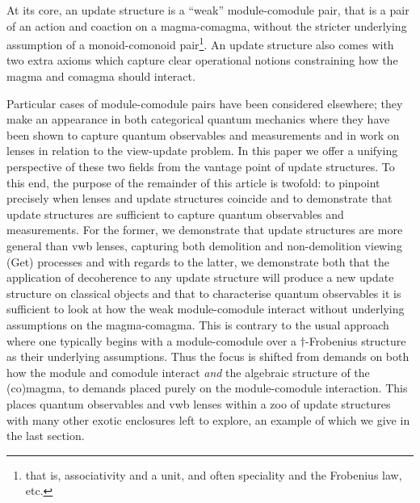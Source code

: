 \documentclass[submission,copyright,creativecommons,sharealike,noncommercial]{eptcs}
\theoremstyle{definition}
\theoremstyle{plain}
\theoremstyle{plain}
\begin{document}
At its core, an update structure is a ``weak'' module-comodule pair, that is a pair of an action and coaction on a magma-comagma, without the stricter underlying assumption of a monoid-comonoid pair\footnote{that is, associativity and a unit, and often speciality and the Frobenius law, etc.}. An update structure also comes with two extra axioms which capture clear operational notions constraining how the magma and comagma should interact.

Particular cases of module-comodule pairs have been considered elsewhere; they make an appearance in both categorical quantum mechanics where they have been shown to capture quantum observables and measurements \cite{coecke_measurements, heunen2019categories} and in work on lenses \cite{bancilhon_update_1981,foster_combinators_nodate} in relation to the view-update problem. In this paper we offer a unifying perspective of these two fields from the vantage point of update structures. To this end, the purpose of the remainder of this article is twofold: to pinpoint precisely when lenses and update structures coincide and to demonstrate that update structures are sufficient to capture quantum observables and measurements. For the former, we demonstrate that update structures are more general than vwb lenses, capturing both demolition and non-demolition viewing (Get) processes and with regards to the latter, we demonstrate both that the application of decoherence to any update structure will produce a new update structure on classical objects and that to characterise quantum observables it is sufficient to look at how the weak module-comodule interact without underlying assumptions on the magma-comagma. This is contrary to the usual approach where one typically begins with a module-comodule over a $\dag$-Frobenius structure as their underlying assumptions. Thus the focus is shifted from demands on both how the module and comodule interact \textit{and} the algebraic structure of the (co)magma, to demands placed purely on the module-comodule interaction. This places quantum observables and vwb lenses within a zoo of update structures with many other exotic enclosures left to explore, an example of which we give in the last section.
\end{document}
